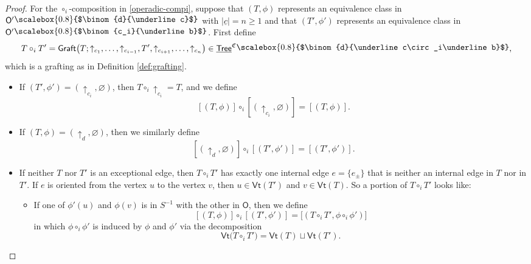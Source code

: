 \documentclass[11pt]{amsbook}
\numberwithin{section}{chapter}
\numberwithin{subsection}{section}
\numberwithin{equation}{section}
\theoremstyle{plain}
\theoremstyle{definition}
\newcommand{\colorc}{\mathfrak{C}}
\newcommand{\graft}{\mathsf{Graft}}
\newcommand{\Vt}{\mathsf{Vt}}
\renewcommand{\O}{\mathsf{O}}
\newcommand{\compi}{\circ_i}
\newcommand{\inv}[1]{{#1}^{-1}}
\newcommand{\Sinv}{\inv{S}}
\newcommand{\Tree}{\mathsf{Tree}}
\newcommand{\uTree}{\underline{\Tree}}
\newcommand{\uTreec}{\uTree^{\colorc}}
\newcommand{\ub}{\underline b}
\newcommand{\uc}{\underline c}
\newcommand{\smallprof}[1]
{\raisebox{.05cm}{\scalebox{0.8}{#1}}}
\newcommand{\sbinom}[2]{\raisebox{.05cm}{\scalebox{0.8}{$\binom{#1}{#2}$}}}
\newcommand{\ciub}{\smallprof{$\binom{c_i}{\ub}$}}
\newcommand{\duc}{\smallprof{$\binom{d}{\uc}$}}
\begin{document}
\begin{proof}
For the $\compi$-composition in \eqref{operadic-compi}, suppose that $(T,\phi)$ represents an equivalence class in $\O'\duc$ with $|\uc|=n\geq 1$ and that $(T',\phi')$ represents an equivalence class in $\O'\ciub$.  First define
\begin{equation}\label{tree-compi}
T\compi T' = \graft\bigl(T; \uparrow_{c_1},\ldots,\uparrow_{c_{i-1}},T',\uparrow_{c_{i+1}},\ldots,\uparrow_{c_n}\bigr) \in \uTreec\sbinom{d}{\uc\compi\ub},
\end{equation}
which is a grafting as in Definition \ref{def:grafting}.
\begin{itemize}
\item If $(T',\phi') = (\uparrow_{c_i},\varnothing)$, then $T \compi \uparrow_{c_i} = T$, and we define
\[[(T,\phi)] \compi [(\uparrow_{c_i},\varnothing)] = [(T,\phi)].\]
\item If $(T,\phi) = (\uparrow_d,\varnothing)$, then we similarly define
\[[(\uparrow_d,\varnothing)] \compi [(T',\phi')] = [(T',\phi')].\]
\item If neither $T$ nor $T'$ is an exceptional edge, then $T\compi T'$ has exactly one internal edge $e=\{e_{\pm}\}$ that is neither an internal edge in $T$ nor in $T'$.  If $e$ is oriented from the vertex $u$ to the vertex $v$, then $u \in \Vt(T')$ and $v \in \Vt(T)$.  So a portion of $T\compi T'$ looks like:
\begin{center}\end{center}
\begin{itemize}
\item If one of $\phi'(u)$ and $\phi(v)$ is in $\Sinv$ with the other in $\O$, then we define
\begin{equation}\label{osinv-compi}
[(T,\phi)] \compi [(T',\phi')] = \bigl[(T\compi T',\phi\compi\phi')\bigr]
\end{equation}
in which $\phi\compi\phi'$ is induced by $\phi$ and $\phi'$ via the decomposition \[\Vt\bigl(T\compi T'\bigr) = \Vt(T) \sqcup \Vt(T').\]

\end{itemize}
\end{itemize}
\end{proof}
\end{document}
